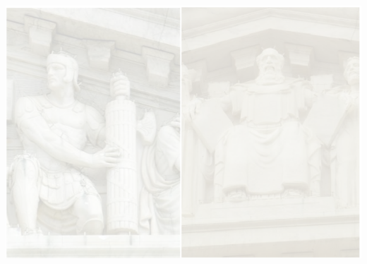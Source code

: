 



\usebackgroundtemplate%
{%
    \includegraphics[keepaspectratio,width=\paperwidth,height=\paperheight]{img/supcourt-facade-background.png}%
}

\def\braces#1{[#1]}




